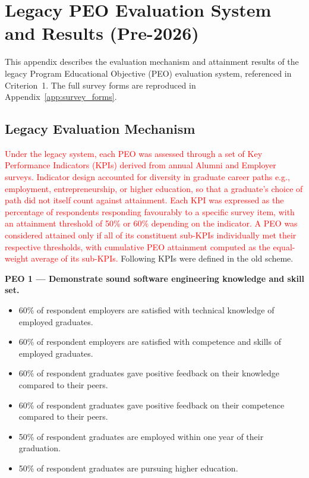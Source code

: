 \chapter{Legacy PEO Evaluation System and Results (Pre-2026)}\label{app:legacy_peo_evaluation}

This appendix describes the evaluation mechanism and attainment results of the legacy Program Educational Objective (PEO) evaluation system, referenced in Criterion~1. The full survey forms are reproduced in Appendix~\ref{app:survey_forms}.

\section{Legacy Evaluation Mechanism}

\textcolor{red}{Under the legacy system, each PEO was assessed through a set of Key Performance Indicators (KPIs) derived from annual Alumni and Employer surveys. Indicator design accounted for diversity in graduate career paths e.g., employment, entrepreneurship, or higher education, so that a graduate's choice of path did not itself count against attainment. Each KPI was expressed as the percentage of respondents responding favourably to a specific survey item, with an attainment threshold of 50\% or 60\% depending on the indicator. A PEO was considered attained only if all of its constituent sub-KPIs individually met their respective thresholds, with cumulative PEO attainment computed as the equal-weight average of its sub-KPIs.} Following KPIs were defined in the old scheme.


\noindent\textbf{PEO 1 --- Demonstrate sound software engineering knowledge and skill set.}
\begin{itemize}[leftmargin=1.5em,topsep=2pt]
\item 60\% of respondent employers are satisfied with technical knowledge of employed graduates.
\item 60\% of respondent employers are satisfied with competence and skills of employed graduates.
\item 60\% of respondent graduates gave positive feedback on their knowledge compared to their peers.
\item 60\% of respondent graduates gave positive feedback on their competence compared to their peers.
\item 50\% of respondent graduates are employed within one year of their graduation.
\item 50\% of respondent graduates are pursuing higher education.
\end{itemize}

